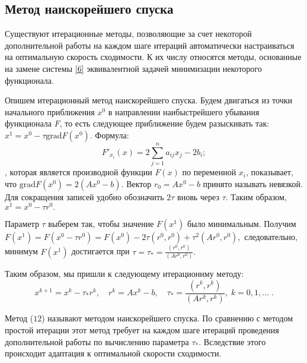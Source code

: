 \documentclass[a4paper,12pt]{article}
\begin{document}
{		\subsection{Метод наискорейшего спуска}
		\hspace{1.25cm}Существуют итерационные методы, позволяющие за счет некоторой дополнительной работы на 
		каждом шаге итераций автоматически настраиваться на оптимальную скорость сходимости. К их числу относятся методы, основанные 
		на замене системы \eqref{6} эквивалентной задачей минимизации некоторого функционала.
		
		Опишем итерационный метод наискорейшего спуска. Будем двигаться из точки началь\-ного приближения $x^0$ в направлении наибыстрейшего убывания функционала $F$, 
		то есть следующее приближение будем разыскивать так: $x^1=x^0 - \tau \mathrm { grad } F(x^0).$ Формула:
		\begin{equation}
			F'_{x_i}(x) = 2\sum\limits_{j=1}^{n}a_{ij}x_j - 2b_i;
			\label{11}
		\end{equation}
		, которая является производной функции $F(x)$ по переменной $x_i$, показывает, что $\mathrm { grad } F(x^0)=2(Ax^0-b).$ 
		Вектор $r_0 = Ax^0-b$ принято называть невязкой. Для сокращения записей удобно обозначить $2\tau$ вновь через $\tau.$ 
		Таким образом, $x^1=x^0-\tau r^0.$
		
		Параметр $\tau$ выберем так, чтобы значение $F(x^1)$ было минимальным. Получим $F(x^1)=F(x^0-\tau r^0)=F(x^0)-2\tau(r^0,r^0)+\tau^2(Ar^0,r^0),$ 
		следовательно, минимум $F(x^1)$ достигается при $\tau =\tau_*=\displaystyle\frac{(r^0, r^0)}{(Ar^0, r^0)}.$
		
		Таким образом, мы пришли к следующему итерационнму методу:
		\begin{equation}
			x^{k+1}=x^k-\tau_* r^k, \quad r^k=Ax^k-b, \quad \tau_*=\displaystyle\frac{(r^k, r^k)}{(Ar^k, r^k)}, \; k=0,1, \dots \;.
			\label{12}
		\end{equation}
		
		Метод ($12$) называют методом наискорейшего спуска. По сравнению с методом простой итерации этот метод требует на каждом шаге итераций 
		проведения дополнительной работы по вычислению параметра $\tau_*.$ Вследствие этого происходит адаптация к оптимальной скорости сходимости.
		
}
\end{document}
